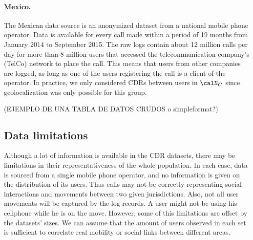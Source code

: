 \paragraph{Mexico.} The Mexican data source is an anonymized dataset from a national mobile phone operator. Data is available for every call made within a period of 19 months from January 2014 to September 2015. The raw logs contain about 12 million calls per day for more than 8 million users that accessed the telecommunication company's (TelCo) network to place the call. This means that users from other companies are logged, as long as one of the users registering the call is a client of the operator. In practice, we only considered CDRs between users in $\calN_C$ since geolocalization was only possible for this group.


(EJEMPLO DE UNA TABLA DE DATOS CRUDOS o simpleformat?)

\subsection{Data limitations}

Although a lot of information is available in the CDR datasets, there may be limitations in their representativeness of the whole population. In each case, data is sourced from a single mobile phone operator, and no information is given on the distribution of its users. Thus calls may not be correctly representing social interactions and movements between two given jurisdictions. Also, not all user movements will be captured by the log records. A user might not be using his cellphone while he is on the move.
However, some of this limitations are offset by the datasets' sizes. We can assume that the amount of users observed in each set is sufficient to correlate real mobility or social links between different areas.

